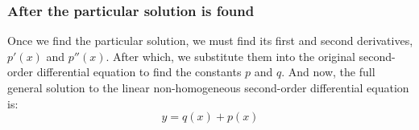 \documentclass[11pt]{article}
\begin{document}
\subsubsection{After the particular solution is found}
\label{sec:orgbf8ff0a}
Once we find the particular solution, we must find its first and second derivatives, \(p'(x)\) and \(p''(x)\). After which, we substitute them into the original second-order differential equation to find the constants \(p\) and \(q\). And now, the full general solution to the linear non-homogeneous second-order differential equation is:
\[y = q(x) + p(x)\]
\end{document}
